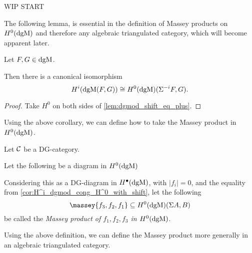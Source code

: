 WIP START

The following lemma, is essential in the definition of Massey products on \( H^0(\operatorname{dgM}) \) and therefore any algebraic triangulated category, which will become apparent later.

\begin{lemma}
    \label{cor:H^i_dgmod_cong_H^0_with_shift}
    Let \( F, G \in \operatorname{dgM} \).

    Then there is a canonical isomorphism
    \[
        H^i(\operatorname{dgM}(F, G)) \cong H^0(\operatorname{dgM})(\Sigma^{-i} F, G).
    \]
\end{lemma}
\begin{proof}
    Take \( H^0 \) on both sides of \autoref{lem:dgmod_shift_eq_plus}.
\end{proof}

Using the above corollary, we can define how to take the Massey product in \( H^0(\operatorname{dgM}) \).

\begin{definition}
    \label{def:massey_product_H^0(dgMod_dg(C))}
    Let \( {\mathcal{C}} \) be a DG-category.
    
    Let the following be a diagram in \( H^0(\operatorname{dgM}) \)
    \begin{center}
    \end{center}
    Considering this as a DG-diagram in \( H^{\bullet}(\operatorname{dgM}) \), with \( |f_i| = 0 \), and the equality from \autoref{cor:H^i_dgmod_cong_H^0_with_shift}, let the following
    \[
        \massey{f_3, f_2, f_1} \subseteq H^0(\dgM)(\Sigma A, B)
    \]
    be called the \emph{Massey product of \( f_1, f_2, f_3 \) in \( H^0(\operatorname{dgM}) \)}.
\end{definition}

Using the above definition, we can define the Massey product more generally in an algebraic triangulated category.


